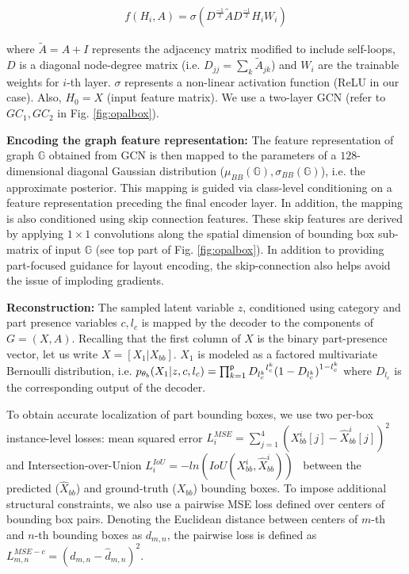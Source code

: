 \documentclass[runningheads]{llncs}
\begin{document}
\begin{align}
    f(H_i,A) = \sigma({D}^{\frac{-1}{2}} \widetilde{A} {D}^{\frac{-1}{2}} H_i W_i)
\end{align}

\noindent where $\widetilde{A} = A + I$ represents the adjacency matrix modified to include self-loops, ${D}$ is a diagonal node-degree matrix (i.e. ${D}_{jj} = \sum_k  \widetilde{A}_{jk}$) and $W_i$ are the trainable weights for $i$-th layer. $\sigma$ represents a non-linear activation function (ReLU in our case). Also, $H_0 = X$ (input feature matrix). We use a two-layer GCN (refer to $GC_1,GC_2$ in Fig. \ref{fig:opalbox}).

\noindent \textbf{Encoding the graph feature representation:} The feature representation of graph $\mathbb{G}$ obtained from GCN is then mapped to the parameters of a $128$-dimensional diagonal Gaussian distribution ($\mu_{BB}(\mathbb{G}),\sigma_{BB}(\mathbb{G})$), i.e. the approximate posterior. This mapping is guided via class-level conditioning on a feature representation preceding the final encoder layer. In addition, the mapping is also conditioned using skip connection features. These skip features are derived by applying $1 \times 1$ convolutions along the spatial dimension of bounding box sub-matrix of input $\mathbb{G}$ (see top part of Fig. \ref{fig:opalbox}). In addition to providing part-focused guidance for layout encoding, the skip-connection also  helps avoid the issue of imploding gradients.

\noindent \textbf{Reconstruction:} The sampled latent variable $z$, conditioned using category and part presence variables $c,l_c$ is mapped by the decoder to the components of $G = (X,A)$. Recalling that the first column of $X$ is the binary part-presence vector, let us write $X = \left[ X_1 \lvert X_{bb}\right]$. $X_1$ is modeled as a factored multivariate Bernoulli distribution, i.e. $p_{{\tiny \theta_{b}}}(X_1|z,c,l_c) =  \prod_{k=1}^{\mathsf{p}} {D_{l_c^k}}^{l_c^k} {(1 - D_{l_c^k})}^{1-l_c^k}$ where $D_{l_c}$ is the corresponding output of the decoder.

To obtain accurate localization of part bounding boxes, we use two per-box instance-level losses: mean squared error $L_i^{MSE} = \sum_{j=1}^4 (X_{bb}^i[j] - \hat{X}_{bb}^i[j])^2$ and Intersection-over-Union $L_i^{IoU} = -ln (IoU(X_{bb}^i,\hat{X}_{bb}^i))$~\cite{UnitBox2016} between the predicted ($\hat{X}_{bb}$) and ground-truth ($X_{bb}$) bounding boxes. To impose additional structural constraints, we also use a pairwise MSE loss defined over centers of bounding box pairs. Denoting the Euclidean distance between centers of $m$-th and $n$-th bounding boxes as $d_{m,n}$, the pairwise loss is defined as $L_{m,n}^{MSE-c} = (d_{m,n} - \hat{d}_{m,n})^2$.
\end{document}
